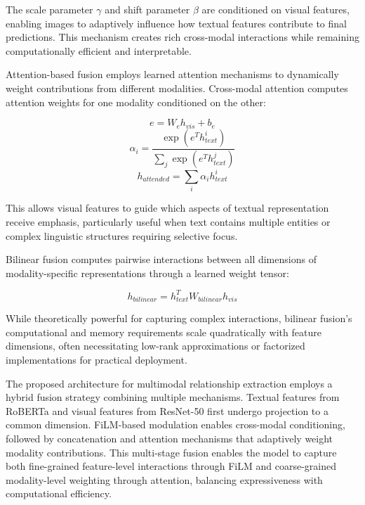 \documentclass[12pt,a4paper]{report}
\begin{document}
The scale parameter $\gamma$ and shift parameter $\beta$ are conditioned on visual features, enabling images to adaptively influence how textual features contribute to final predictions. This mechanism creates rich cross-modal interactions while remaining computationally efficient and interpretable.

Attention-based fusion employs learned attention mechanisms to dynamically weight contributions from different modalities. Cross-modal attention computes attention weights for one modality conditioned on the other:

\begin{equation}
e = W_e h_{vis} + b_e
\end{equation}
\begin{equation}
\alpha_i = \frac{\exp(e^T h_{text}^i)}{\sum_j \exp(e^T h_{text}^j)}
\end{equation}
\begin{equation}
h_{attended} = \sum_i \alpha_i h_{text}^i
\end{equation}

This allows visual features to guide which aspects of textual representation receive emphasis, particularly useful when text contains multiple entities or complex linguistic structures requiring selective focus.

Bilinear fusion computes pairwise interactions between all dimensions of modality-specific representations through a learned weight tensor:

\begin{equation}
h_{bilinear} = h_{text}^T W_{bilinear} h_{vis}
\end{equation}

While theoretically powerful for capturing complex interactions, bilinear fusion's computational and memory requirements scale quadratically with feature dimensions, often necessitating low-rank approximations or factorized implementations for practical deployment.

The proposed architecture for multimodal relationship extraction employs a hybrid fusion strategy combining multiple mechanisms. Textual features from RoBERTa and visual features from ResNet-50 first undergo projection to a common dimension. FiLM-based modulation enables cross-modal conditioning, followed by concatenation and attention mechanisms that adaptively weight modality contributions. This multi-stage fusion enables the model to capture both fine-grained feature-level interactions through FiLM and coarse-grained modality-level weighting through attention, balancing expressiveness with computational efficiency.
\end{document}
